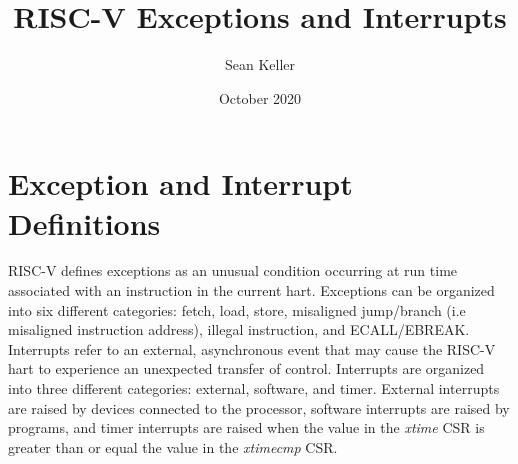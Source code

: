 \documentclass[12pt]{article}
\title{RISC-V Exceptions and Interrupts}
\author{Sean Keller}
\date{October 2020}
\begin{document}
\maketitle
\newpage

\section{Exception and Interrupt Definitions}
RISC-V defines exceptions as an unusual condition occurring at run time associated with an instruction in the current hart. Exceptions can be organized into six different categories: fetch, load, store, misaligned jump/branch (i.e misaligned instruction address), illegal instruction, and ECALL/EBREAK. Interrupts refer to an external, asynchronous event that may cause the RISC-V hart to experience an unexpected transfer of control. Interrupts are organized into three different categories: external, software, and timer. External interrupts are raised by devices connected to the processor, software interrupts are raised by programs, and timer interrupts are raised when the value in the \emph{xtime} CSR is greater than or equal the value in the \emph{xtimecmp} CSR.
\end{document}
